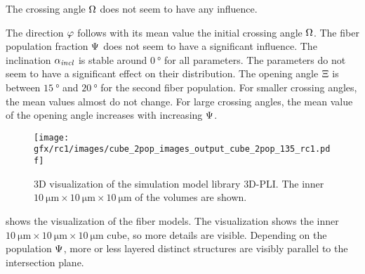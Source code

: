 The crossing angle $\textnormal{$\Omega$}$ does not seem to have any influence.
\par
% 
The direction $\textnormal{$\varphi$}$ follows with its mean value the initial crossing angle $\textnormal{$\Omega$}$.
The fiber population fraction $\textnormal{$\Psi$}$ does not seem to have a significant influence. 
The inclination $\textnormal{$\alpha_{\mathit{incl}}$}$ is stable around $\SI{0}{\degree}$ for all parameters.
The parameters do not seem to have a significant effect on their distribution.
The opening angle $\textnormal{$\Xi$}$ is between $\SI{15}{\degree}$ and $\SI{20}{\degree}$ for the second fiber population.
For smaller crossing angles, the mean values almost do not change.
For large crossing angles, the mean value of the opening angle increases with increasing $\textnormal{$\Psi$}$.
\par
%
\begin{figure}[!t]
\centering
\texttt{[image: gfx/rc1/images/cube\_2pop\_images\_output\_cube\_2pop\_135\_rc1.pdf]}
\caption[]{3D visualization of the simulation model library \ac{3D-PLI}.
The inner $\SI{10}{\micro\meter} \times \SI{10}{\micro\meter} \times \SI{10}{\micro\meter}$ of the volumes are shown.}
\label{fig:modelImages}
\end{figure}
% 
 shows the visualization of the fiber models.
The visualization shows the inner $\SI{10}{\micro\meter} \times \SI{10}{\micro\meter} \times \SI{10}{\micro\meter}$ cube, so more details are visible.
Depending on the population $\textnormal{$\Psi$}$, more or less layered distinct structures are visibly parallel to the intersection plane.
\par
% 
%
% 
% 
